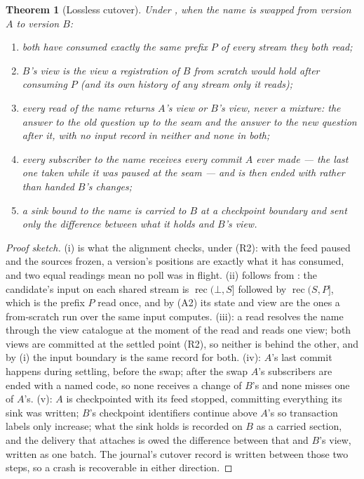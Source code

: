 \documentclass[11pt,a4paper]{article}
\renewcommand{\_}{\oldunderscore\allowbreak}
\newtheorem{theorem}{Theorem}[section]
\newcommand{\rec}{\operatorname{rec}}
\newcommand{\code}[1]{\texttt{\pvbreakable{#1}}}
\begin{document}
\begin{theorem}[Lossless cutover]\label{thm:cutover}
Under , when the name is swapped from version $A$ to version $B$:
\begin{enumerate}[label=(\roman*),leftmargin=*]
\item both have consumed exactly the same prefix $P$ of every stream they both read;
\item $B$'s view is the view a registration of $B$ from scratch would hold after consuming $P$ (and its
      own history of any stream only it reads);
\item every read of the name returns $A$'s view or $B$'s view, never a mixture: the answer to the old
      question up to the seam and the answer to the new question after it, with no input record in
      neither and none in both;
\item every subscriber to the name receives every commit $A$ ever made --- the last one taken while it
      was paused at the seam --- and is then ended with \code{PRV-4019} rather than handed $B$'s
      changes;
\item a sink bound to the name is carried to $B$ at a checkpoint boundary and sent only the difference
      between what it holds and $B$'s view.
\end{enumerate}
\end{theorem}
\begin{proof}[Proof sketch]
(i) is what the alignment checks, under (R2): with the feed paused and the sources frozen, a version's
positions are exactly what it has consumed, and two equal readings mean no poll was in flight. (ii)
follows from : the candidate's input on each shared stream is $\rec(\bot, S]$ followed
by $\rec(S, P]$, which is the prefix $P$ read once, and by (A2) its state and view are the ones a
from-scratch run over the same input computes. (iii): a read resolves the name through the view
catalogue at the moment of the read and reads one view; both views are committed at the settled point
(R2), so neither is behind the other, and by (i) the input boundary is the same record for both. (iv):
$A$'s last commit happens during settling, before the swap; after the swap $A$'s subscribers are ended
with a named code, so none receives a change of $B$'s and none misses one of $A$'s. (v): $A$ is
checkpointed with its feed stopped, committing everything its sink was written; $B$'s checkpoint
identifiers continue above $A$'s so transaction labels only increase; what the sink holds is recorded
on $B$ as a carried section, and the delivery that attaches is owed the difference between that and
$B$'s view, written as one batch. The journal's cutover record is written between those two steps, so
a crash is recoverable in either direction.
\end{proof}
\end{document}
